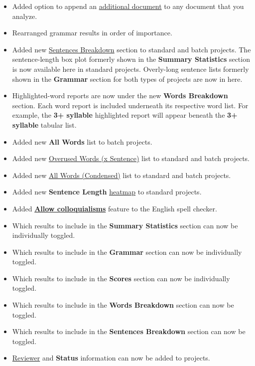 \documentclass[
]{book}
\providecommand{\tightlist}{%
  \setlength{\itemsep}{0pt}\setlength{\parskip}{0pt}}
\theoremstyle{definition}
\theoremstyle{definition}
\theoremstyle{definition}
\theoremstyle{definition}
\theoremstyle{remark}
\begin{document}
\begin{itemize}
\tightlist
\item
  Added option to append an \protect\hyperlink{additional-document}{additional document} to any document that you analyze.
\item
  Rearranged grammar results in order of importance.
\item
  Added new \protect\hyperlink{reviewing-sentences-breakdown}{Sentences Breakdown} section to standard and batch projects. The sentence-length box plot formerly shown in the \textbf{Summary Statistics} section is now available here in standard projects. Overly-long sentence lists formerly shown in the \textbf{Grammar} section for both types of projects are now in here.
\item
  Highlighted-word reports are now under the new \textbf{Words Breakdown} section. Each word report is included underneath its respective word list. For example, the \textbf{3+ syllable} highlighted report will appear beneath the \textbf{3+ syllable} tabular list.
\item
  Added new \textbf{All Words} list to batch projects.
\item
  Added new \protect\hyperlink{reviewing-overused-by-sentence}{Overused Words (x Sentence)} list to standard and batch projects.
\item
  Added new \protect\hyperlink{reviewing-word-breakdowns}{All Words (Condensed)} list to standard and batch projects.
\item
  Added new \textbf{Sentence Length} \protect\hyperlink{reviewing-sentences-breakdown}{heatmap} to standard projects.
\item
  Added \protect\hyperlink{options-grammar}{\textbf{Allow colloquialisms}} feature to the English spell checker.
\item
  Which results to include in the \textbf{Summary Statistics} section can now be individually toggled.
\item
  Which results to include in the \textbf{Grammar} section can now be individually toggled.
\item
  Which results to include in the \textbf{Scores} section can now be individually toggled.
\item
  Which results to include in the \textbf{Words Breakdown} section can now be toggled.
\item
  Which results to include in the \textbf{Sentences Breakdown} section can now be toggled.
\item
  \protect\hyperlink{project-settings}{Reviewer} and \textbf{Status} information can now be added to projects.

\end{itemize}
\end{document}
